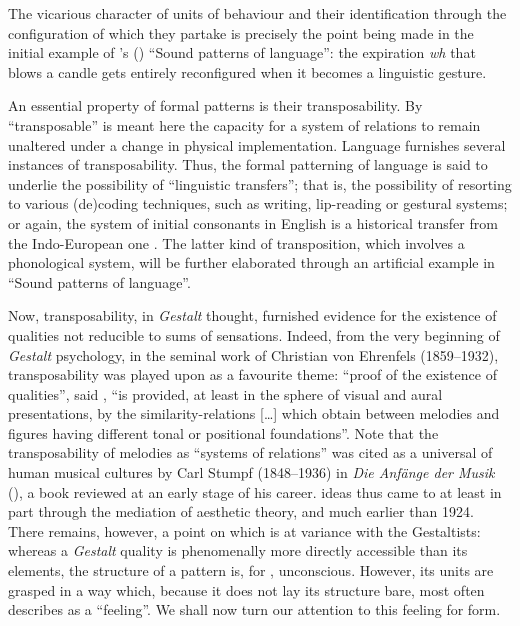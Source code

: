 \documentclass[output=paper]{langscibook}
\begin{document}
The vicarious character of units of behaviour and their identification through the configuration of which they partake is precisely the point being made in the initial example of {\Sapir}'s (\citeyear{Sapir1925}) ``Sound patterns of language'': the expiration \emph{wh} that blows a candle gets entirely reconfigured when it becomes a linguistic gesture. 

An essential property of formal patterns is their transposability. By ``transposable'' is meant here the capacity for a system of relations to remain unaltered under a change in physical implementation. Language furnishes several instances of transposability. Thus, the formal patterning of language is said to underlie the possibility of ``linguistic transfers''; that is, the possibility of resorting to various (de)coding techniques, such as writing, lip-reading or gestural systems; or again, the system of initial consonants in English is a historical transfer from the Indo-European one \citep[200]{Sapir1921}. The latter kind of transposition, which involves a phonological system, will be further elaborated through an artificial example in ``Sound patterns of language''.

Now, transposability, in \emph{Gestalt} thought, furnished evidence for the existence of qualities not reducible to sums of sensations. Indeed, from the very beginning of \emph{Gestalt} psychology, in the seminal work of Christian von Ehrenfels (1859--1932), transposability was played upon as a favourite theme: ``proof of the existence of  qualities'', said \citet[90]{Ehrenfels1988}, ``is provided, at least in the sphere of visual and aural presentations, by the similarity-relations […] which obtain between melodies and figures having different tonal or positional foundations''. Note that the transposability of melodies as ``systems of relations'' was cited as a universal of human musical cultures by Carl Stumpf (1848--1936) in \emph{Die Anfänge der Musik} (\citeyear{Stumpf1911}), a book {\Sapir} reviewed at an early stage of his career.  ideas thus came to {\Sapir} at least in part through the mediation of aesthetic theory, and much earlier than 1924. There remains, however, a point on which {\Sapir} is at variance with the Gestaltists: whereas a \emph{Gestalt} quality is phenomenally more directly accessible than its elements, the structure of a pattern is, for {\Sapir}, unconscious. However, its units are grasped in a way which, because it does not lay its structure bare, {\Sapir} most often describes as a ``feeling''. We shall now turn our attention to this feeling for form.
\end{document}
